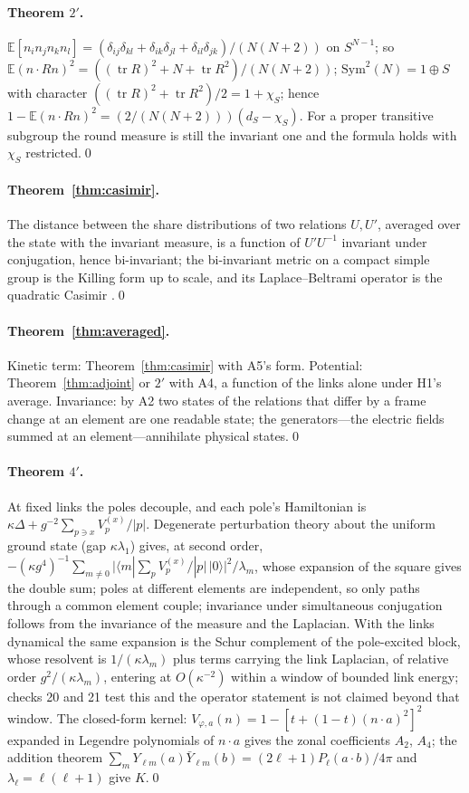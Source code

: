 \documentclass[11pt,a4paper]{article}
\theoremstyle{plain}
\theoremstyle{definition}
\theoremstyle{remark}
\newcommand{\tr}{\operatorname{tr}}
\newcommand{\E}{\mathbb{E}}
\newcommand{\Sym}{\mathrm{Sym}}
\begin{document}
\paragraph{Theorem $2'$.} $\E[n_in_jn_kn_l]=(\delta_{ij}\delta_{kl}+\delta_{ik}\delta_{jl}+\delta_{il}\delta_{jk})/(N(N+2))$ on $S^{N-1}$; so $\E(n\cdot Rn)^2=((\tr R)^2+N+\tr R^2)/(N(N+2))$; $\Sym^2(N)=1\oplus S$ with character $((\tr R)^2+\tr R^2)/2=1+\chi_S$; hence $1-\E(n\cdot Rn)^2=(2/(N(N+2)))(d_S-\chi_S)$. For a proper transitive subgroup the round measure is still the invariant one and the formula holds with $\chi_S$ restricted.\qed

\paragraph{Theorem~\ref{thm:casimir}.} The distance between the share distributions of two relations $U,U'$, averaged over the state with the invariant measure, is a function of $U'U^{-1}$ invariant under conjugation, hence bi-invariant; the bi-invariant metric on a compact simple group is the Killing form up to scale, and its Laplace--Beltrami operator is the quadratic Casimir \cite{helgason}.\qed

\paragraph{Theorem~\ref{thm:averaged}.} Kinetic term: Theorem~\ref{thm:casimir} with A5's form. Potential: Theorem~\ref{thm:adjoint} or $2'$ with A4, a function of the links alone under H1's average. Invariance: by A2 two states of the relations that differ by a frame change at an element are one readable state; the generators---the electric fields summed at an element---annihilate physical states.\qed

\paragraph{Theorem $4'$.} At fixed links the poles decouple, and each pole's Hamiltonian is $\kappa\Delta+g^{-2}\sum_{p\ni x}V_p^{(x)}/|p|$. Degenerate perturbation theory about the uniform ground state (gap $\kappa\lambda_1$) gives, at second order, $-(\kappa g^4)^{-1}\sum_{m\neq0}\big|\langle m|\sum_pV_p^{(x)}/|p|\,|0\rangle\big|^2/\lambda_m$, whose expansion of the square gives the double sum; poles at different elements are independent, so only paths through a common element couple; invariance under simultaneous conjugation follows from the invariance of the measure and the Laplacian. With the links dynamical the same expansion is the Schur complement of the pole-excited block, whose resolvent is $1/(\kappa\lambda_m)$ plus terms carrying the link Laplacian, of relative order $g^2/(\kappa\lambda_m)$, entering at $O(\kappa^{-2})$ within a window of bounded link energy; checks 20 and 21 test this and the operator statement is not claimed beyond that window. The closed-form kernel: $V_{\varphi,a}(n)=1-[t+(1-t)(n\cdot a)^2]^2$ expanded in Legendre polynomials of $n\cdot a$ gives the zonal coefficients $A_2$, $A_4$; the addition theorem $\sum_mY_{\ell m}(a)\bar Y_{\ell m}(b)=(2\ell+1)P_\ell(a\cdot b)/4\pi$ and $\lambda_\ell=\ell(\ell+1)$ give $K$.\qed
\end{document}
